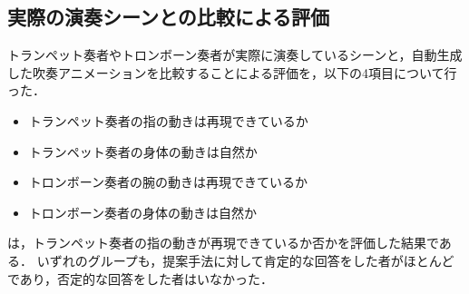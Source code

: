 \subsection{実際の演奏シーンとの比較による評価}
トランペット奏者やトロンボーン奏者が実際に演奏しているシーンと，自動生成した吹奏アニメーションを比較することによる評価を，以下の4項目について行った．
\begin{itemize}
	\item トランペット奏者の指の動きは再現できているか
	\item トランペット奏者の身体の動きは自然か
	\item トロンボーン奏者の腕の動きは再現できているか
	\item トロンボーン奏者の身体の動きは自然か
\end{itemize}
\vspace{5mm}
\par
{}は，トランペット奏者の指の動きが再現できているか否かを評価した結果である．
いずれのグループも，提案手法に対して肯定的な回答をした者がほとんどであり，否定的な回答をした者はいなかった．
